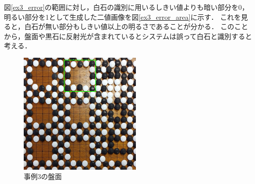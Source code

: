 \documentclass[openright]{nitocs}
\numberwithin{equation}{section}
\begin{document}
                図\ref{ex3_error}の範囲に対し，白石の識別に用いるしきい値よりも暗い部分を0，明るい部分を1として生成した二値画像を図\ref{ex3_error_area}に示す．
                これを見ると，白石が無い部分もしきい値以上の明るさであることが分かる．
                このことから，盤面や黒石に反射光が含まれているとシステムは誤って白石と識別すると考える．

                \begin{figure}[tb] %
                    \begin{center}
                    \includegraphics[clip,width=60mm]{DSC_0098/boardImg.jpg} 
                    \caption{事例3の盤面}
                    \label{ex3_img}
                    \end{center}
                \end{figure}
\end{document}
